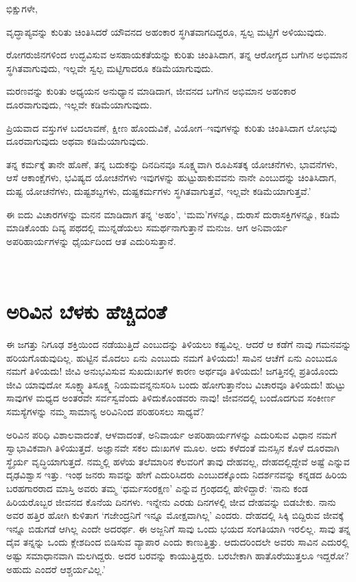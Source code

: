 ಭಿಕ್ಷುಗಳೇ,

ವೃದ್ಧಾಪ್ಯವನ್ನು ಕುರಿತು ಚಿಂತಿಸಿದರೆ ಯೌವನದ ಅಹಂಕಾರ ಸ್ಥಗಿತವಾಗದಿದ್ದರೂ, ಸ್ವಲ್ಪ ಮಟ್ಟಿಗೆ ಅಳಿಯುವುದು.

ರೋಗರುಜಿನಗಳಿಂದ ಉದ್ಭವಿಸುವ ಅಸಹಾಯಕತೆಯನ್ನು ಕುರಿತು ಚಿಂತಿಸಿದಾಗ, ತನ್ನ ಆರೋಗ್ಯದ ಬಗೆಗಿನ ಅಭಿಮಾನ ಸ್ಥಗಿತವಾಗುವುದು, ಇಲ್ಲವೇ ಸ್ವಲ್ಪ ಮಟ್ಟಿಗಾದರೂ ಕಡಿಮೆಯಾಗುವುದು.

ಮರಣವನ್ನು ಕುರಿತು ಅಧ್ಯಯನ ಅನುಧ್ಯಾನ ಮಾಡಿದಾಗ, ಜೀವನದ ಬಗೆಗಿನ ಅಭಿಮಾನ ಅಹಂಕಾರ ದೂರವಾಗುವುದು, ಇಲ್ಲವೇ ಕಡಿಮೆಯಾಗುವುದು.

ಪ್ರಿಯವಾದ ವಸ್ತುಗಳ ಬದಲಾವಣೆ, ಕ್ಷೀಣ ಹೊಂದುವಿಕೆ, ವಿಯೋಗ–ಇವುಗಳನ್ನು ಕುರಿತು ಚಿಂತಿಸಿದಾಗ ಲೋಭವು ದೂರವಾಗುವುದು ಅಥವಾ ಕಡಿಮೆಯಾಗುವುದು.

ತನ್ನ ಕರ್ಮಕ್ಕೆ ತಾನೇ ಹೊಣೆ, ತನ್ನ ಬದುಕನ್ನು ದಿನದಿನವೂ ಸೂಕ್ಷ್ಮವಾಗಿ ರೂಪಿಸತಕ್ಕ ಯೋಚನೆಗಳು, ಭಾವನೆಗಳು, ಆಸೆ ಆಕಾಂಕ್ಷೆಗಳು, ಭವಿಷ್ಯದ ಯೋಚನೆಗಳು ಇವುಗಳನ್ನು ಹುಟ್ಟುಹಾಕುವವನು ನಾನೇ ಎಂಬುದನ್ನು ಚಿಂತಿಸಿದಾಗ, ದುಷ್ಟ ಯೋಚನೆಗಳು, ದುಷ್ಟಶಬ್ದಗಳು, ದುಷ್ಟಕರ್ಮಗಳು ಸ್ಥಗಿತವಾಗುತ್ತವೆ, ಇಲ್ಲವೇ ಕಡಿಮೆಯಾಗುತ್ತವೆ.’

ಈ ಐದು ವಿಚಾರಗಳನ್ನು ಮನನ ಮಾಡಿದಾಗ ತನ್ನ ‘ಅಹಂ’, ‘ಮಮ’ಗಳನ್ನೂ, ದುರಾಸೆ ದುರಾಸಕ್ತಿಗಳನ್ನೂ, ಕಡಿಮೆ ಮಾಡಿಕೊಂಡು ದಿವ್ಯ ಪಥದಲ್ಲಿ ಮುನ್ನಡೆಯಲು ಸಮರ್ಥನಾಗುತ್ತಾನೆ ಮನುಜ. ಆಗ ಅನಿವಾರ್ಯ ಅಪರಿಹಾರ್ಯಗಳನ್ನು ಧೈರ್ಯದಿಂದ ಆತ ಎದುರಿಸುತ್ತಾನೆ.

~\\[-1.3cm]


\section*{ಅರಿವಿನ ಬೆಳಕು ಹೆಚ್ಚಿದಂತೆ}

\vskip -6pt

ಈ ಜಗತ್ತು ನಿಗೂಢ ಶಕ್ತಿಯಿಂದ ನಡೆಯುತ್ತಿದೆ ಎಂಬುದನ್ನು ತಿಳಿಯಲು ಕಷ್ಟವಿಲ್ಲ. ಆದರೆ ಆ ಕಡೆಗೆ ನಾವು ಗಮನವನ್ನು ಹರಿಯಗೊಡುವುದಿಲ್ಲ. ಹುಟ್ಟಿನ ಮೊದಲು ಏನು ಎಂಬುದು ನಮಗೆ ತಿಳಿಯದು! ಸಾವಿನ ಆಚೆಗೆ ಏನು ಎಂಬುದೂ ನಮಗೆ ತಿಳಿಯದು! ಜೀವಿ ಅನುಭವಿಸುವ ಸುಖದುಃಖಗಳ ಕಾರಣ ಅರ್ಥವೂ ತಿಳಿಯದು! ಜಗತ್ತಿನಲ್ಲಿ ಪ್ರತಿಯೊಂದು ಜೀವಿ ಯಾವುದೋ ಸೂಕ್ಷ್ಮಾತಿಸೂಕ್ಷ್ಮ ನಿಯಮವನ್ನನುಸರಿಸಿ ಬಂದು ಹೋಗುತ್ತಾನೆಂಬ ವಿಚಾರವೂ ತಿಳಿಯದು! ಹುಟ್ಟು ಸಾವುಗಳ ಮಧ್ಯದ ಅಂತರವೇ ಸರ್ವಸ್ವವೆಂದು ತಿಳಿದುಕೊಂಡವರು ನಾವು! ಜೀವನದಲ್ಲಿ ಬಂದೊದಗುವ ಸಂಕೀರ್ಣ ಸಮಸ್ಯೆಗಳನ್ನು ನಮ್ಮ ಸಾಮಾನ್ಯ ಅರಿವಿನಿಂದ ಪರಿಹರಿಸಲು ಸಾಧ್ಯವೆ?

ಅರಿವಿನ ಪರಿಧಿ ವಿಶಾಲವಾದಂತೆ, ಆಳವಾದಂತೆ, ಅನಿವಾರ್ಯ ಅಪರಿಹಾರ್ಯಗಳನ್ನು ಎದುರಿಸುವ ವಿಧಾನ ನಮಗೆ ಸ್ವಾಭಾವಿಕವಾಗಿ ತಿಳಿಯುತ್ತದೆ. ಅಜ್ಞಾನವೇ ಸಕಲ ದುಃಖಗಳ ಮೂಲ. ಅದು ಕಳೆದಂತೆ ಮನಸ್ಸಿನ ಕೊಳೆ ದೂರವಾಗಿ ಸ್ಥೈರ್ಯ ವೃದ್ಧಿಯಾಗುತ್ತದೆ. ನಮ್ಮಲ್ಲಿ ಹಳೆಯ ತಲೆಮಾರಿನ ಕೆಲವರಿಗೆ ತಾವು ದೇಹವಲ್ಲ, ದೇಹದಲ್ಲಿದ್ದೇವೆ ಅಷ್ಟೆ ಎನ್ನುವ ದೃಢವಿಶ್ವಾಸ ಇತ್ತು. ಇಂಥ ಜನರು ಸಾವನ್ನು ಹೇಗೆ ಎದುರಿಸಿದರು ಎಂಬುದಕ್ಕೊಂದು ನಿದರ್ಶನವನ್ನು ಕನ್ನಡದ ಹಿರಿಯ ಬರಹಗಾರರಾದ ಮಾಸ್ತಿ ಅವರು ತಮ್ಮ ‘ಧರ್ಮಸಂರಕ್ಷಣ’ ಎನ್ನುವ ಗ್ರಂಥದಲ್ಲಿ ಹೇಳಿದ್ದಾರೆ: ‘ನಾನು ಕಂಡ ಹಿರಿಯರೊಬ್ಬರ ಜೀವನದ ಕೊನೆಯ ದಿನಗಳು. ಇನ್ನೇನು ಎರಡು ದಿನಗಳಲ್ಲಿ ಜೀವ ದೇಹವನ್ನು ಬಿಡಬೇಕು. ನಾನು ಅವರ ಹತ್ತಿರ ಹೋಗಿ ಕುಳಿತಾಗ ‘ಗಜೇಂದ್ರನಿಗೆ ಇನ್ನೂ ಮೋಕ್ಷವಾಗಿಲ್ಲ’ ಎಂದರು. ದೇಹದಲ್ಲಿ ಸಿಕ್ಕಿ ಬಿದ್ದಿರುವ ಜೀವಕ್ಕೆ ಇನ್ನೂ ಬಿಡುಗಡೆ ಆಗಿಲ್ಲ ಎಂದೇ ಅದರರ್ಥ. ಈ ಅಜ್ಜನಿಗೆ ಸಾವು ಒಂದು ಭಯದ ಸಂಗತಿಯಾಗಿ ಇರಲಿಲ್ಲ. ಸಾವು ತನ್ನ ದೈವ ತನ್ನನ್ನು ಒಂದು ಕ್ಲೇಶದಿಂದ ಬಿಡಿಸುವ ವ್ಯಾಪಾರ ಎಂದು ಕಾಣುತ್ತಿತ್ತು. ಆದುದರಿಂದಲೇ ಅವರು ಸಾವಿನ ಎದುರಲ್ಲಿ ಅಷ್ಟು ಸಮಾಧಾನವಾಗಿ ಮಲಗಿದ್ದರು. ಅದರ ಬರವನ್ನು ಕಾಯುತ್ತಿದ್ದರು. ಬರಬೇಕಾಗಿ ಹಾತೊರೆಯುತ್ತಲೂ ಇದ್ದರೋ? ಅಹುದು ಎಂದರೆ ಆಶ್ಚರ್ಯವಿಲ್ಲ.’


